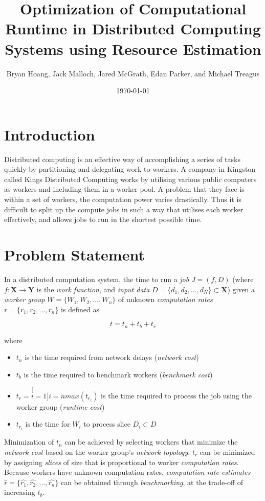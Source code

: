 \documentclass{article}
\title{Optimization of Computational Runtime in Distributed Computing Systems using Resource Estimation}
\author{Bryan Hoang, Jack Malloch, Jared McGrath, Edan Parker, and Michael Treagus}
\date{\today}
\begin{document}
\maketitle

\section{Introduction}

Distributed computing is an effective way of accomplishing a series of tasks quickly by partitioning and delegating work to workers. A company in Kingston called Kings Distributed Computing works by utilising various public computers as workers and including them in a worker pool. A problem that they face is within a set of workers, the computation power varies drastically. Thus it is difficult to split up the compute jobs in such a way that utilises each worker effectively, and allows jobs to run in the shortest possible time.

\section{Problem Statement}

In a distributed computation system, the time to run a \textit{job} $J = (f, D)$ (where $f: \mathbf{X} \rightarrow \mathbf{Y}$ is the \textit{work function}, and \textit{input data} $D = \{d_1, d_2, ..., d_N\} \subset \mathbf{X}$) given a \textit{worker group} $W = \{W_1, W_2, ..., W_n\}$ of unknown \textit{computation rates} $r = \{r_1, r_2, ..., r_n\}$ is defined as

\[t = t_n + t_b + t_r\]

where

\begin{itemize}
    \item $t_n$ is the time required from network delays (\textit{network cost})
    \item $t_b$ is the time required to benchmark workers (\textit{benchmark cost})
    \item $t_r = \stackrel[i=1]{i=n}{max}(t_{r_i})$ is the time required to process the job using the worker group (\textit{runtime cost})
    \item $t_{r_i}$ is the time for $W_i$ to process slice $D_i \subset D$
\end{itemize}

Minimization of $t_n$ can be achieved by selecting workers that minimize the \textit{network cost} based on the worker group's \textit{network topology}. $t_r$ can be minimized by assigning \textit{slices} of size that is proportional to worker \textit{computation rates}. Because workers have unknown computation rates, \textit{computation rate estimates} $\hat{r} = \{\hat{r_1}, \hat{r_2}, ..., \hat{r_n}\}$ can be obtained through \textit{benchmarking}, at the trade-off of increasing $t_b$.
\end{document}
